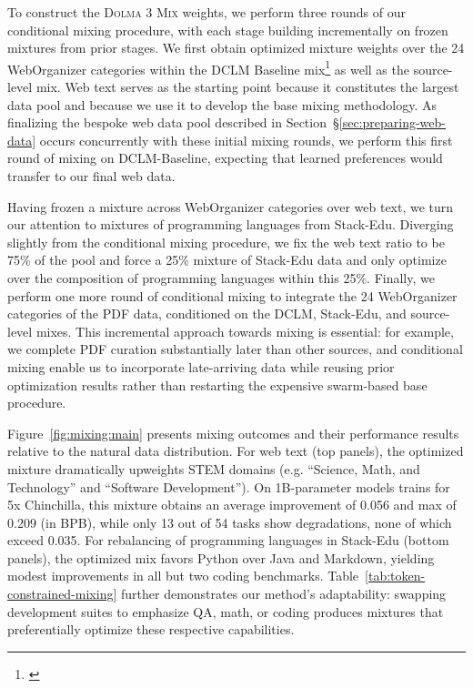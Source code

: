 \documentclass[table]{ai2style/ai2}
\newcommand{\dolmatoomix}{\textsc{Dolma 3 Mix}\xspace}
\begin{document}
To construct the \dolmatoomix weights, we perform three rounds of our conditional mixing procedure, with each stage building incrementally on frozen mixtures from prior stages. We first obtain optimized mixture weights over the 24 WebOrganizer categories within the DCLM Baseline mix\footnote{\href{https://data.commoncrawl.org/contrib/datacomp/DCLM-baseline/index.html}{}} as well as the source-level mix. Web text serves as the starting point because it constitutes the largest data pool and because we use it to develop the base mixing methodology. As finalizing the bespoke web data pool described in Section~\S\ref{sec:preparing-web-data} occurs concurrently with these initial mixing rounds, we perform this first round of mixing on DCLM-Baseline, expecting that learned preferences would transfer to our final web data.

Having frozen a mixture across WebOrganizer categories over web text, we turn our attention to mixtures of programming languages from Stack-Edu. Diverging slightly from the conditional mixing procedure, we fix the web text ratio to be 75\% of the pool and force a 25\% mixture of Stack-Edu data and only optimize over the composition of programming languages within this 25\%. Finally, we perform one more round of conditional mixing to integrate the 24 WebOrganizer categories of the PDF data, conditioned on the DCLM, Stack-Edu, and source-level mixes. This incremental approach towards mixing is essential: for example, we complete PDF curation substantially later than other sources, and conditional mixing enable us to incorporate late-arriving data while reusing prior optimization results rather than restarting the expensive swarm-based base procedure.

Figure~\ref{fig:mixing:main} presents mixing outcomes and their performance results relative to the natural data distribution. For web text (top panels), the optimized mixture dramatically upweights STEM domains (e.g. ``Science, Math, and Technology'' and ``Software Development''). On 1B-parameter models trains for 5x Chinchilla, this mixture obtains an  average improvement of 0.056 and max of 0.209 (in BPB), while only 13 out of 54 tasks show degradations, none of which exceed 0.035. For rebalancing of programming languages in Stack-Edu (bottom panels), the optimized mix favors Python over Java and Markdown, yielding modest improvements in all but two coding benchmarks. Table~\ref{tab:token-constrained-mixing} further demonstrates our method's adaptability: swapping development suites to emphasize QA, math, or coding produces mixtures that preferentially optimize these respective capabilities.
\end{document}
